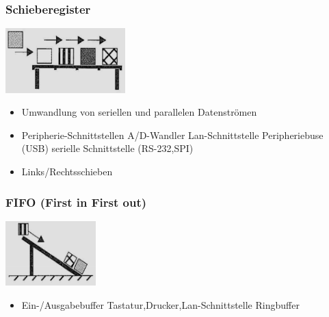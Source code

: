 \begin{multicols}{3}
\begin{minipage}{\linewidth}
    \subsubsection{Schieberegister}
        \includegraphics[height=2.5cm]{images/SystembusSpeicherSpeichersystem/SpeicherSysSchiebReg}
    \begin{itemize}
        \item Umwandlung von seriellen und parallelen Datenströmen
        \item Peripherie-Schnittstellen
        \subitem A/D-Wandler
        \subitem Lan-Schnittstelle
        \subitem Peripheriebuse (USB)
        \subitem serielle Schnittstelle (RS-232,SPI)
        \item Links/Rechtsschieben
    \end{itemize}
\end{minipage}

\begin{minipage}{\linewidth}
    \subsubsection{FIFO (First in First out)}
    \includegraphics[height=2.5cm]{images/SystembusSpeicherSpeichersystem/SpeicherSysFIFO}
    \begin{itemize}
        \item Ein-/Ausgabebuffer
        \subitem Tastatur,Drucker,Lan-Schnittstelle
        \subitem Ringbuffer
    \end{itemize}
\end{minipage}

\begin{minipage}{\linewidth}

\end{minipage}
\end{multicols}
